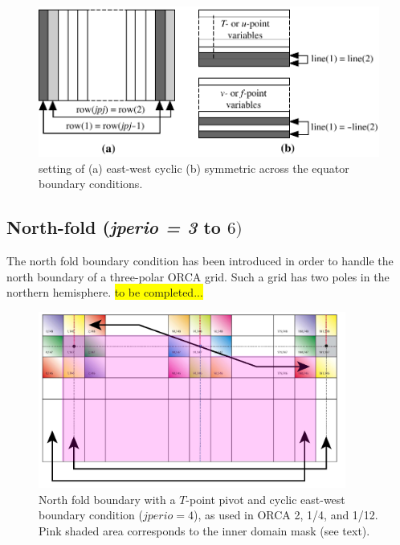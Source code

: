\begin{figure}[!t]     \begin{center}
\includegraphics[width=1.0\textwidth]{./TexFiles/Figures/Fig_LBC_jperio.pdf}
\caption{    \label{Fig_LBC_jperio}
setting of (a) east-west cyclic  (b) symmetric across the equator boundary conditions.}
\end{center}   \end{figure}

\subsection{North-fold (\textit{jperio = 3 }to $6)$ }
\label{LBC_north_fold}

The north fold boundary condition has been introduced in order to handle the north 
boundary of a three-polar ORCA grid. Such a grid has two poles in the northern hemisphere. 
\colorbox{yellow}{to be completed...}

\begin{figure}[!t]    \begin{center}
\includegraphics[width=0.90\textwidth]{./TexFiles/Figures/Fig_North_Fold_T.pdf}
\caption{    \label{Fig_North_Fold_T} 
North fold boundary with a $T$-point pivot and cyclic east-west boundary condition 
($jperio=4$), as used in ORCA 2, 1/4, and 1/12. Pink shaded area corresponds 
to the inner domain mask (see text). }
\end{center}   \end{figure}

